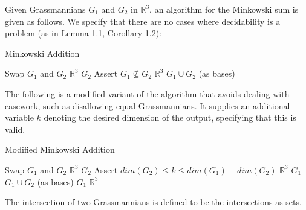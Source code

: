 \documentclass[12pt]{article}
\newcommand{\R}{\mathbb{R}}
\newenvironment{definition}[2][Definition]{\begin{trivlist}
\item[\hskip \labelsep {\bfseries #1}\hskip \labelsep {\bfseries #2.}]}{\end{trivlist}}
\newenvironment{proposition}[2][Proposition]{\begin{trivlist}
\item[\hskip \labelsep {\bfseries #1}\hskip \labelsep {\bfseries #2.}]}{\end{trivlist}}
\begin{document}
\begin{proposition}{2.2}
Given Grassmannians \(G_1\) and \(G_2\) in \(\R^3\), an algorithm for the Minkowski sum is given as follows. We specify that there are no cases where decidability is a problem (as in Lemma 1.1, Corollary 1.2):

\begin{algorithm}[H]
\caption{Minkowski Addition}
\begin{algorithmic}[1]
\State Swap $G_1$ and $G_2$
\EndIf
{}
\Return $\R^3$
\Return $G_2$
\EndIf
\State Assert $G_1 \not\subseteq G_2$
\Return $\R^3$
\Return $G_1 \cup G_2$ (as bases)
\Else{
\Return $\R^3$
}
\EndIf
\EndProcedure
\end{algorithmic}
\end{algorithm}

\end{proposition}

\begin{proposition}{2.3}
The following is a modified variant of the algorithm that avoids dealing with casework, such as disallowing equal Grassmannians. It supplies an additional variable \(k\) denoting the desired dimension of the output, specifying that this is valid.

\begin{algorithm}[H]
\caption{Modified Minkowski Addition}
\begin{algorithmic}[2]
\State Swap $G_1$ and $G_2$
\EndIf
{}
\Return $\R^3$
\Return $G_2$
\EndIf
\State Assert $dim(G_2) \leq k \leq dim(G_1) + dim(G_2)$
\Return $\R^3$
\Return $G_1$
\Return $G_1 \cup G_2$ (as bases)
\Return $G_1$
\Return $\R^3$
\EndIf
\EndProcedure
\end{algorithmic}
\end{algorithm}

\end{proposition}

\begin{definition}{3.1}
The intersection of two Grassmannians is defined to be the intersections as sets.
\end{definition}
\end{document}

